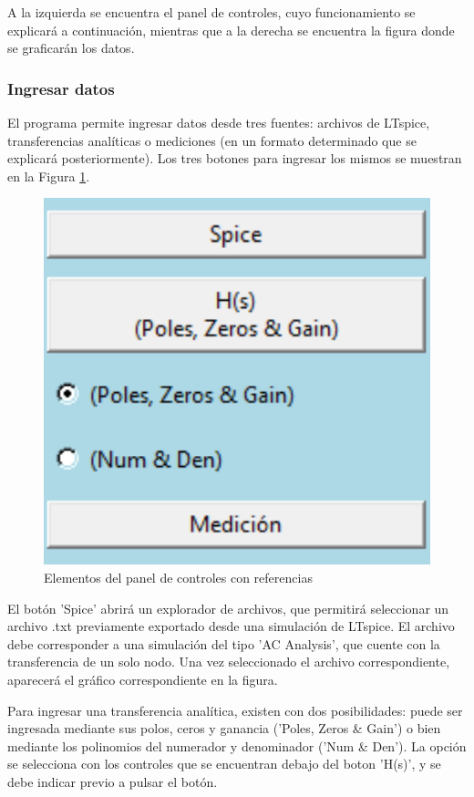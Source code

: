 A la izquierda se encuentra el panel de controles, cuyo funcionamiento se explicará a continuación, mientras que a la derecha se encuentra la figura donde se graficarán los datos.


\subsubsection{Ingresar datos}
El programa permite ingresar datos desde tres fuentes: archivos de LTspice, transferencias analíticas o mediciones (en un formato determinado que se explicará posteriormente). Los tres botones para ingresar los mismos se muestran en la Figura \ref{fig:inputControls}.

\begin{figure}[ht]
\centering
\includegraphics[scale=0.3]{resources/inputControls.png}
\caption{Elementos del panel de controles con referencias}
\label{fig:inputControls}
\end{figure}

El botón 'Spice' abrirá un explorador de archivos, que permitirá seleccionar un archivo .txt previamente exportado desde una simulación de LTspice. El archivo debe corresponder a una simulación del tipo 'AC Analysis', que cuente con la transferencia de un solo nodo. Una vez seleccionado el archivo correspondiente, aparecerá el gráfico correspondiente en la figura.

Para ingresar una transferencia analítica, existen con dos posibilidades: puede ser ingresada mediante sus polos, ceros y ganancia ('Poles, Zeros \& Gain') o bien mediante los polinomios del numerador y denominador ('Num \& Den'). La opción se selecciona con los controles que se encuentran debajo del boton 'H(s)', y se debe indicar previo a pulsar el botón. 

